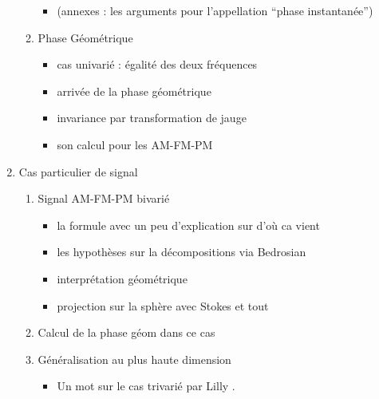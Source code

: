 \begin{enumerate}[label=\arabic* --- ]
\begin{enumerate}[label=\arabic{enumi}.\arabic* --- ]
\begin{itemize}
			\item (annexes : les arguments pour l'appellation ``phase instantanée'')
			
		\end{itemize}
		
		\item Phase Géométrique
		\begin{itemize} \normalfont
			
			\item cas univarié : égalité des deux fréquences
			
			\item arrivée de la phase géométrique
			
			\item invariance par transformation de jauge 
			
			\item son calcul pour les AM-FM-PM
			
		\end{itemize}
	\end{enumerate}	
	
	\item Cas particulier de signal
	\begin{enumerate}[label=\arabic{enumi}.\arabic* --- ]
		
		\item Signal AM-FM-PM bivarié
		\begin{itemize} \normalfont
			
			\item la formule avec un peu d'explication sur d'où ca vient
			
			\item les hypothèses sur la décompositions via Bedrosian
			
			\item interprétation géométrique
			
			\item projection sur la sphère avec Stokes et tout
			
		\end{itemize}
		
		\item Calcul de la phase géom dans ce cas
		
		\item Généralisation au plus haute dimension
		\begin{itemize}\normalfont
			
			\item Un mot sur le cas trivarié par Lilly \cite{lilly_modulated_2011}.
			

\end{itemize}
\end{enumerate}
\end{enumerate}
